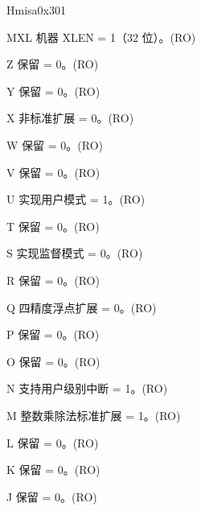 \begin{register}{H}{misa}{0x301}\label{regdesc:MISA}
%
%
%
%
%
%
%
%
%
%
%
%
%
%
%
%
%
%
%
%
%
%
%
%
%
%
%
%
\regnewline%
\begin{regdesc}\begin{reglist}
\label{fielddesc:MISAMXL}\item [MXL] 机器 XLEN = 1（32 位）。(RO)
\label{fielddesc:MISAZ}\item [Z] 保留 = 0。(RO)
\label{fielddesc:MISAY}\item [Y] 保留 = 0。(RO)
\label{fielddesc:MISAX}\item [X] 非标准扩展 = 0。(RO)
\label{fielddesc:MISAW}\item [W] 保留 = 0。(RO)
\label{fielddesc:MISAV}\item [V] 保留 = 0。(RO)
\label{fielddesc:MISAU}\item [U] 实现用户模式 = 1。(RO)
\label{fielddesc:MISAT}\item [T] 保留 = 0。(RO)
\label{fielddesc:MISAS}\item [S] 实现监督模式 = 0。(RO)
\label{fielddesc:MISAR}\item [R] 保留 = 0。(RO)
\label{fielddesc:MISAQ}\item [Q] 四精度浮点扩展 = 0。(RO)
\label{fielddesc:MISAP}\item [P] 保留 = 0。(RO)
\label{fielddesc:MISAO}\item [O] 保留 = 0。(RO)
\label{fielddesc:MISAN}\item [N] 支持用户级别中断 = 1。(RO)
\label{fielddesc:MISAM}\item [M] 整数乘除法标准扩展 = 1。(RO)
\label{fielddesc:MISAL}\item [L] 保留 = 0。(RO)
\label{fielddesc:MISAK}\item [K] 保留 = 0。(RO)
\label{fielddesc:MISAJ}\item [J] 保留 = 0。(RO)

\end{reglist}
\end{regdesc}
\end{register}
